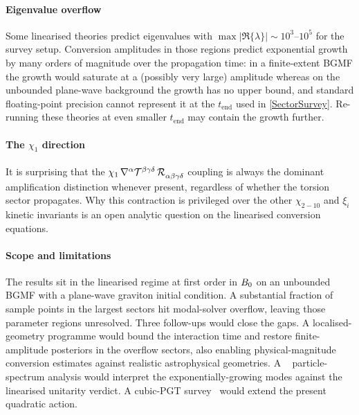 \paragraph*{Eigenvalue overflow}
Some linearised theories predict eigenvalues with $\max|\Re\{\lambda\}|\sim 10^3$--$10^5$
for the survey setup.
Conversion amplitudes in those regions predict exponential growth by
many orders of magnitude over the propagation time: in a
finite-extent BGMF the growth would saturate at a
(possibly very large) amplitude whereas
on the unbounded plane-wave background the growth has no upper
bound, and standard floating-point precision cannot represent it
at the $t_\text{end}$ used in \cref{SectorSurvey}. Re-running these
theories at even smaller $t_\text{end}$ may contain
the growth further.

\paragraph*{The $\chi_1$ direction}
It is surprising that the $\chi_1\,\rcD{^\alpha}\MAGT{^{\beta\gamma\delta}}\,
\MAGF{_{\alpha\beta\gamma\delta}}$ coupling is always the dominant
amplification distinction whenever present, regardless of whether
the torsion sector propagates. Why this contraction is privileged
over the other $\chi_{2\!-\!10}$ and $\xi_i$ kinetic invariants is
an open analytic question on the linearised conversion equations.

\paragraph*{Scope and limitations}
The results sit in the linearised regime at first order in $B_0$
on an unbounded BGMF with a plane-wave graviton initial condition. A
substantial fraction of sample points in the largest sectors hit
modal-solver overflow, leaving those parameter regions unresolved.
Three follow-ups would close the gaps. A localised-geometry programme
would bound the interaction time and restore finite-amplitude
posteriors in the overflow sectors, also enabling physical-magnitude
conversion estimates against realistic astrophysical geometries. A
\PSALTer{}~\cite{barker2024psalter,barker2025psalter2}
particle-spectrum analysis would interpret the exponentially-growing
modes against the linearised unitarity verdict. A cubic-PGT
survey~\cite{bahamonde2025cubic} would extend the present quadratic
action.

